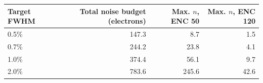 \begin{tabular}{lrrr}\toprule
Target FWHM & Total noise budget (electrons) & Max. $n$, ENC 50 & Max. $n$, ENC 120\\\midrule
0.5\% & 147.3 & 8.7 & 1.5\\
0.7\% & 244.2 & 23.8 & 4.1\\
1.0\% & 374.4 & 56.1 & 9.7\\
2.0\% & 783.6 & 245.6 & 42.6\\
\bottomrule\end{tabular}
